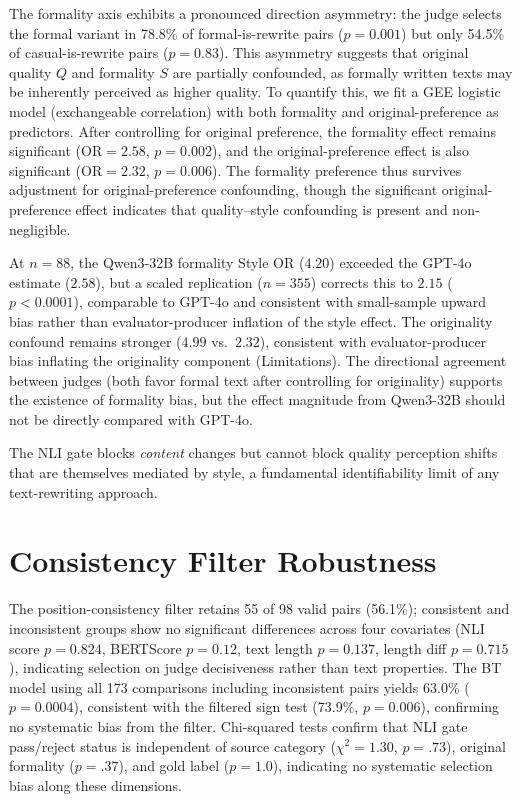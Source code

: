 The formality axis exhibits a pronounced direction asymmetry: the judge selects the formal variant in 78.8\% of formal-is-rewrite pairs ($p = 0.001$) but only 54.5\% of casual-is-rewrite pairs ($p = 0.83$).
This asymmetry suggests that original quality $Q$ and formality $S$ are partially confounded, as formally written texts may be inherently perceived as higher quality.
To quantify this, we fit a GEE logistic model (exchangeable correlation) with both formality and original-preference as predictors.
After controlling for original preference, the formality effect remains significant ($\text{OR} = 2.58$, $p = 0.002$), and the original-preference effect is also significant ($\text{OR} = 2.32$, $p = 0.006$).
The formality preference thus survives adjustment for original-preference confounding, though the significant original-preference effect indicates that quality--style confounding is present and non-negligible.

At $n = 88$, the Qwen3-32B formality Style OR ($4.20$) exceeded the GPT-4o estimate ($2.58$), but a scaled replication ($n = 355$) corrects this to $2.15$ ($p < 0.0001$), comparable to GPT-4o and consistent with small-sample upward bias rather than evaluator-producer inflation of the style effect.
The originality confound remains stronger ($4.99$ vs.\ $2.32$), consistent with evaluator-producer bias inflating the originality component (Limitations).
The directional agreement between judges (both favor formal text after controlling for originality) supports the existence of formality bias, but the effect magnitude from Qwen3-32B should not be directly compared with GPT-4o.

The NLI gate blocks \emph{content} changes but cannot block quality perception shifts that are themselves mediated by style, a fundamental identifiability limit of any text-rewriting approach.

\section{Consistency Filter Robustness}
\label{sec:consistency}

The position-consistency filter retains 55 of 98 valid pairs (56.1\%); consistent and inconsistent groups show no significant differences across four covariates (NLI score $p = 0.824$, BERTScore $p = 0.12$, text length $p = 0.137$, length diff $p = 0.715$), indicating selection on judge decisiveness rather than text properties.
The BT model using all 173 comparisons including inconsistent pairs yields 63.0\% ($p = 0.0004$), consistent with the filtered sign test (73.9\%, $p = 0.006$), confirming no systematic bias from the filter.
Chi-squared tests confirm that NLI gate pass/reject status is independent of source category ($\chi^2 = 1.30$, $p = .73$), original formality ($p = .37$), and gold label ($p = 1.0$), indicating no systematic selection bias along these dimensions.

